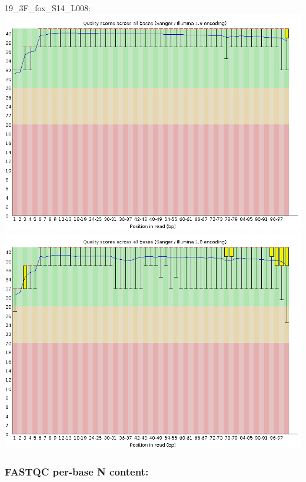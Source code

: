 \documentclass[
]{article}
\begin{document}
19\_3F\_fox\_S14\_L008:
\includegraphics{fastqc_plots/19_3F_fox_S14_L008_R1_001_perbasequality.png}
\includegraphics{fastqc_plots/19_3F_fox_S14_L008_R2_001_perbasequality.png}

\subsubsection{FASTQC per-base N
content:}\label{fastqc-per-base-n-content}
\end{document}
